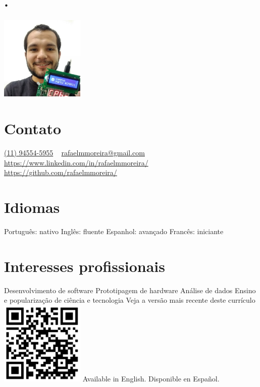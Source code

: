 \documentclass[]{cv-style}          %
\begin{document}
\lastupdated


\begin{aside}
\section{.}
\flushleft%
\includegraphics[width=4cm]{photo}
\section{Contato}
\href{https://wa.me/5511945545955}{(11) 94554-5955}
~
\href{mailto:rafaelmmoreira@gmail.com}{rafaelmmoreira@gmail.com}
~
\url{https://www.linkedin.com/in/rafaelmmoreira/}
~
\url{https://github.com/rafaelmmoreira/}
%
\section{Idiomas}
Português: nativo
Inglês: fluente
Espanhol: avançado
Francês: iniciante
%
\section{Interesses profissionais}
Desenvolvimento de software
Prototipagem de hardware
Análise de dados
Ensino e popularização de ciência e tecnologia
%
\vspace{3.7cm}
Veja a versão mais recente deste currículo
\includegraphics[width=4cm]{qrcode}
Available in English.
Disponible en Español.
%
\end{aside}
\end{document}
